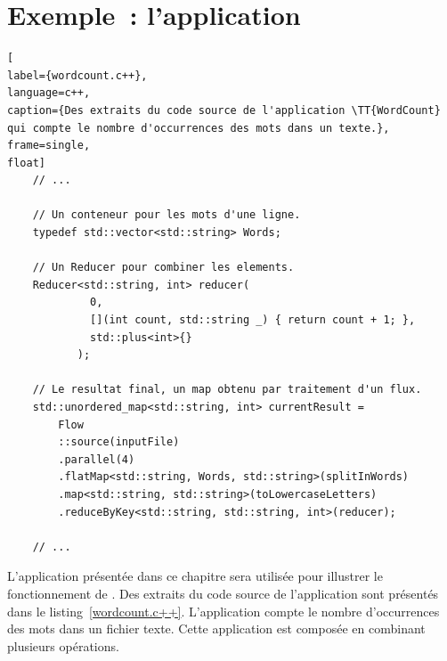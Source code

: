 \section{Exemple~: l'application }
\label{descriptionWordCount.sect}


\begin{lstlisting}[
label={wordcount.c++},
language=c++,
caption={Des extraits du code source de l'application \TT{WordCount} qui compte le nombre d'occurrences des mots dans un texte.},
frame=single,
float]
    // ...

    // Un conteneur pour les mots d'une ligne.
    typedef std::vector<std::string> Words;

    // Un Reducer pour combiner les elements.
    Reducer<std::string, int> reducer(
             0, 
             [](int count, std::string _) { return count + 1; },
             std::plus<int>{}
           );

    // Le resultat final, un map obtenu par traitement d'un flux.
    std::unordered_map<std::string, int> currentResult = 
        Flow
        ::source(inputFile)
        .parallel(4)
        .flatMap<std::string, Words, std::string>(splitInWords)			
        .map<std::string, std::string>(toLowercaseLetters)			
        .reduceByKey<std::string, std::string, int>(reducer); 

    // ...
\end{lstlisting}

L'application  pr\'esent\'ee dans ce chapitre sera utilisée pour illustrer le fonctionnement de . Des extraits du code source de l'application sont présentés dans le listing~\ref{wordcount.c++}. L'application compte le nombre d'occurrences des mots dans un fichier texte. Cette application est compos\'ee en combinant plusieurs op\'erations.



